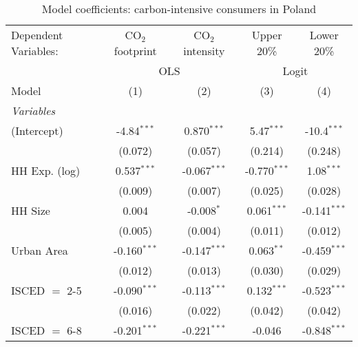 
\begin{table}[htbp!]
   \centering
   \small
   \begin{adjustbox}{width = 1\textwidth, max height = 0.95\textheight, center}
      \begin{threeparttable}[b]
         \caption{\label{tab:Logit_1_POL} Model coefficients: carbon-intensive consumers in Poland}
         \begin{tabular}{lcccc}
            \tabularnewline \midrule \midrule
            Dependent Variables: & CO$_{2}$ footprint & CO$_{2}$ intensity & Upper 20\%     & Lower 20\%\\   
             & \multicolumn{2}{c}{OLS} & \multicolumn{2}{c}{Logit} \\ 
            Model                & (1)                & (2)                & (3)            & (4)\\  
            \midrule
            \emph{Variables}\\
            (Intercept)          & -4.84$^{***}$      & 0.870$^{***}$      & 5.47$^{***}$   & -10.4$^{***}$\\   
                                 & (0.072)            & (0.057)            & (0.214)        & (0.248)\\   
            HH Exp. (log)        & 0.537$^{***}$      & -0.067$^{***}$     & -0.770$^{***}$ & 1.08$^{***}$\\   
                                 & (0.009)            & (0.007)            & (0.025)        & (0.028)\\   
            HH Size              & 0.004              & -0.008$^{*}$       & 0.061$^{***}$  & -0.141$^{***}$\\   
                                 & (0.005)            & (0.004)            & (0.011)        & (0.012)\\   
            Urban Area           & -0.160$^{***}$     & -0.147$^{***}$     & 0.063$^{**}$   & -0.459$^{***}$\\   
                                 & (0.012)            & (0.013)            & (0.030)        & (0.029)\\   
            ISCED $=$ 2-5        & -0.090$^{***}$     & -0.113$^{***}$     & 0.132$^{***}$  & -0.523$^{***}$\\   
                                 & (0.016)            & (0.022)            & (0.042)        & (0.042)\\   
            ISCED $=$ 6-8        & -0.201$^{***}$     & -0.221$^{***}$     & -0.046         & -0.848$^{***}$\\   

\end{tabular}
\end{threeparttable}
\end{adjustbox}
\end{table}
